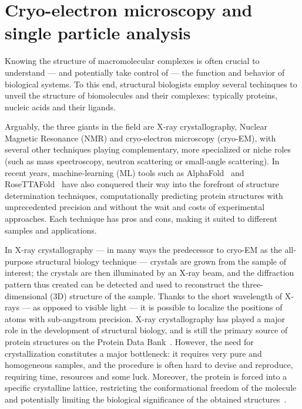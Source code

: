 \chapter[Cryo-EM and SPA]{Cryo-electron microscopy and single particle analysis}\label{em}

Knowing the structure of macromolecular complexes is often crucial to understand --- and potentially take control of --- the function and behavior of biological systems.
To this end, structural biologists employ several techinques to unveil the structure of biomolecules and their complexes: typically proteins, nucleic acids and their ligands.

Arguably, the three giants in the field are X-ray crystallography, Nuclear Magnetic Resonance (NMR) and cryo-electron microscopy (cryo-EM), with several other techniques playing complementary, more specialized or niche roles (such as mass spectroscopy, neutron scattering or small-angle scattering).
In recent years, machine-learning (ML) tools such as AlphaFold~\cite{jumperHighlyAccurateProtein2021,abramsonAccurateStructurePrediction2024} and RoseTTAFold~\cite{baekAccuratePredictionProtein2021} have also conquered their way into the forefront of structure determination techniques, computationally predicting protein structures with unprecedented precision and without the wait and costs of experimental approaches.
Each technique has pros and cons, making it suited to different samples and applications.

In X-ray crystallography --- in many ways the predecessor to cryo-EM as the all-purpose structural biology technique --- crystals are grown from the sample of interest; the crystals are then illuminated by an X-ray beam, and the diffraction pattern thus created can be detected and used to reconstruct the three-dimensional (3D) structure of the sample.
Thanks to the short wavelength of X-rays --- as opposed to visible light --- it is possible to localize the positions of atoms with sub-angstrom precision.
X-ray crystallography has played a major role in the development of structural biology, and is still the primary source of protein structures on the Protein Data Bank~\cite{bermanProteinDataBank2000,bermanAnnouncingWorldwideProtein2003}.
However, the need for crystallization constitutes a major bottleneck: it requires very pure and homogeneous samples, and the procedure is often hard to devise and reproduce, requiring time, resources and some luck.
Moreover, the protein is forced into a specific crystalline lattice, restricting the conformational freedom of the molecule and potentially limiting the biological significance of the obtained structures~\cite{ravikumarComparisonSidechainDispersion2022}.

